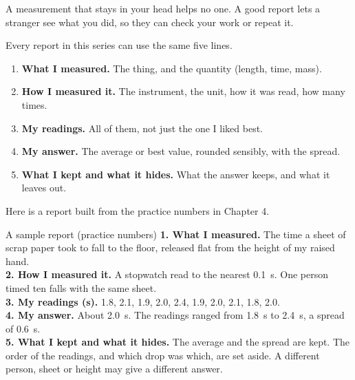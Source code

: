 \label{ch6}

A measurement that stays in your head helps no one. A good report lets a stranger see what you did, so they can check your work or repeat it.

Every report in this series can use the same five lines.

\begin{tcolorbox}[enhanced,colback=white,colframe=ink!60,boxrule=1pt,arc=2mm,left=8pt,right=8pt,top=5pt,bottom=5pt,before skip=7pt,after skip=7pt]
\sffamily\small
\begin{enumerate}[leftmargin=1.6em,itemsep=0.3em]
\item \textbf{What I measured.} The thing, and the quantity (length, time, mass).
\item \textbf{How I measured it.} The instrument, the unit, how it was read, how many times.
\item \textbf{My readings.} All of them, not just the one I liked best.
\item \textbf{My answer.} The average or best value, rounded sensibly, with the spread.
\item \textbf{What I kept and what it hides.} What the answer keeps, and what it leaves out.
\end{enumerate}
\end{tcolorbox}

Here is a report built from the practice numbers in Chapter 4.

\begin{worked}{A sample report (practice numbers)}
\textbf{1. What I measured.} The time a sheet of scrap paper took to fall to the floor, released flat from the height of my raised hand.\\
\textbf{2. How I measured it.} A stopwatch read to the nearest 0.1~s. One person timed ten falls with the same sheet.\\
\textbf{3. My readings (s).} 1.8, 2.1, 1.9, 2.0, 2.4, 1.9, 2.0, 2.1, 1.8, 2.0.\\
\textbf{4. My answer.} About 2.0~s. The readings ranged from 1.8~s to 2.4~s, a spread of 0.6~s.\\
\textbf{5. What I kept and what it hides.} The average and the spread are kept. The order of the readings, and which drop was which, are set aside. A different person, sheet or height may give a different answer.
\end{worked}

